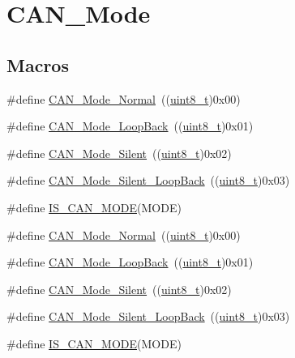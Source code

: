 \hypertarget{group___c_a_n___mode}{}\section{C\+A\+N\+\_\+\+Mode}
\label{group___c_a_n___mode}
\subsection*{Macros}
\begin{DoxyCompactItemize}
\item 
\#define \hyperlink{group___c_a_n___mode_gaaf1f48ab4917ccfd5fd31dd781d59e29}{C\+A\+N\+\_\+\+Mode\+\_\+\+Normal}~((\hyperlink{_p_e___types_8h_aba7bc1797add20fe3efdf37ced1182c5}{uint8\+\_\+t})0x00)
\item 
\#define \hyperlink{group___c_a_n___mode_gaad036c944403186eb3496ff65020c0ee}{C\+A\+N\+\_\+\+Mode\+\_\+\+Loop\+Back}~((\hyperlink{_p_e___types_8h_aba7bc1797add20fe3efdf37ced1182c5}{uint8\+\_\+t})0x01)
\item 
\#define \hyperlink{group___c_a_n___mode_gac05e5d666f18eb35e8da70e6e17e8fb8}{C\+A\+N\+\_\+\+Mode\+\_\+\+Silent}~((\hyperlink{_p_e___types_8h_aba7bc1797add20fe3efdf37ced1182c5}{uint8\+\_\+t})0x02)
\item 
\#define \hyperlink{group___c_a_n___mode_ga087afa0d24d2cf399225993573c984eb}{C\+A\+N\+\_\+\+Mode\+\_\+\+Silent\+\_\+\+Loop\+Back}~((\hyperlink{_p_e___types_8h_aba7bc1797add20fe3efdf37ced1182c5}{uint8\+\_\+t})0x03)
\item 
\#define \hyperlink{group___c_a_n___mode_ga5d6480c240edeba383b4e07d65814d98}{I\+S\+\_\+\+C\+A\+N\+\_\+\+M\+O\+DE}(M\+O\+DE)
\item 
\#define \hyperlink{group___c_a_n___mode_gaaf1f48ab4917ccfd5fd31dd781d59e29}{C\+A\+N\+\_\+\+Mode\+\_\+\+Normal}~((\hyperlink{_p_e___types_8h_aba7bc1797add20fe3efdf37ced1182c5}{uint8\+\_\+t})0x00)
\item 
\#define \hyperlink{group___c_a_n___mode_gaad036c944403186eb3496ff65020c0ee}{C\+A\+N\+\_\+\+Mode\+\_\+\+Loop\+Back}~((\hyperlink{_p_e___types_8h_aba7bc1797add20fe3efdf37ced1182c5}{uint8\+\_\+t})0x01)
\item 
\#define \hyperlink{group___c_a_n___mode_gac05e5d666f18eb35e8da70e6e17e8fb8}{C\+A\+N\+\_\+\+Mode\+\_\+\+Silent}~((\hyperlink{_p_e___types_8h_aba7bc1797add20fe3efdf37ced1182c5}{uint8\+\_\+t})0x02)
\item 
\#define \hyperlink{group___c_a_n___mode_ga087afa0d24d2cf399225993573c984eb}{C\+A\+N\+\_\+\+Mode\+\_\+\+Silent\+\_\+\+Loop\+Back}~((\hyperlink{_p_e___types_8h_aba7bc1797add20fe3efdf37ced1182c5}{uint8\+\_\+t})0x03)
\item 
\#define \hyperlink{group___c_a_n___mode_ga5d6480c240edeba383b4e07d65814d98}{I\+S\+\_\+\+C\+A\+N\+\_\+\+M\+O\+DE}(M\+O\+DE)
\end{DoxyCompactItemize}


